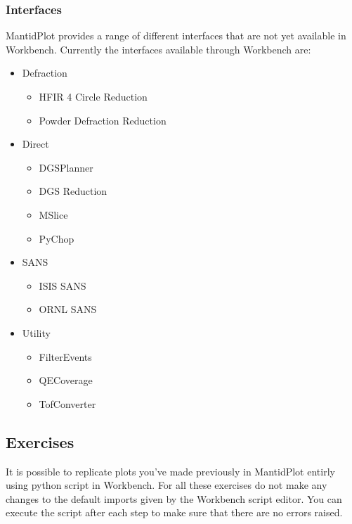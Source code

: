 \documentclass[letterpaper,10pt,english,openany]{sphinxmanual}
\begin{document}
\subsubsection{Interfaces}
\label{\detokenize{mantid_basic_course/using_workbench/04_What_is_missing:interfaces}}
MantidPlot provides a range of different interfaces that are not yet available in Workbench. Currently the interfaces available through Workbench are:
\begin{itemize}
\item {} 
Defraction
\begin{itemize}
\item {} 
HFIR 4 Circle Reduction

\item {} 
Powder Defraction Reduction

\end{itemize}

\item {} 
Direct
\begin{itemize}
\item {} 
DGSPlanner

\item {} 
DGS Reduction

\item {} 
MSlice

\item {} 
PyChop

\end{itemize}

\item {} 
SANS
\begin{itemize}
\item {} 
ISIS SANS

\item {} 
ORNL SANS

\end{itemize}

\item {} 
Utility
\begin{itemize}
\item {} 
FilterEvents

\item {} 
QECoverage

\item {} 
TofConverter

\end{itemize}

\end{itemize}


\subsection{Exercises}
\label{\detokenize{mantid_basic_course/using_workbench/05_Exercises:exercises}}\label{\detokenize{mantid_basic_course/using_workbench/05_Exercises:id1}}\label{\detokenize{mantid_basic_course/using_workbench/05_Exercises::doc}}
It is possible to replicate plots you’ve made previously in MantidPlot entirly using python script in Workbench.
For all these exercises do not make any changes to the default imports given by the Workbench script editor.
You can execute the script after each step to make sure that there are no errors raised.
\end{document}
